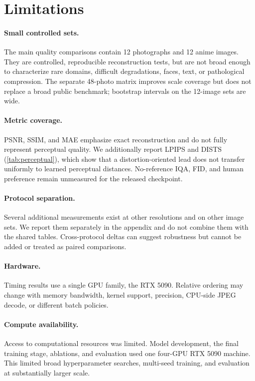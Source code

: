 \documentclass[10pt]{article}
\begin{document}
\section{Limitations}
\label{sec:limitations}

\paragraph{Small controlled sets.}
The main quality comparisons contain 12 photographs and 12 anime images. They
are controlled, reproducible reconstruction tests, but are not broad enough to
characterize rare domains, difficult degradations, faces, text, or pathological
compression. The separate 48-photo matrix improves scale coverage but does not
replace a broad public benchmark; bootstrap intervals on the 12-image sets are
wide.

\paragraph{Metric coverage.}
PSNR, SSIM, and MAE emphasize exact reconstruction and do not fully represent
perceptual quality. We additionally report LPIPS and DISTS
(\cref{tab:perceptual}), which show that a distortion-oriented lead does not
transfer uniformly to learned perceptual distances. No-reference IQA, FID, and
human preference remain unmeasured for the released checkpoint.

\paragraph{Protocol separation.}
Several additional measurements exist at other resolutions and on other image
sets. We report them separately in the appendix and do not combine them with
the shared tables. Cross-protocol deltas can suggest robustness but cannot be
added or treated as paired comparisons.

\paragraph{Hardware.}
Timing results use a single GPU family, the RTX 5090. Relative ordering may
change with memory bandwidth, kernel support, precision, CPU-side JPEG decode,
or different batch policies.

\paragraph{Compute availability.}
Access to computational resources was limited. Model development, the final
training stage, ablations, and evaluation used one four-GPU RTX 5090 machine.
This limited broad hyperparameter searches, multi-seed training, and
evaluation at substantially larger scale.
\end{document}
